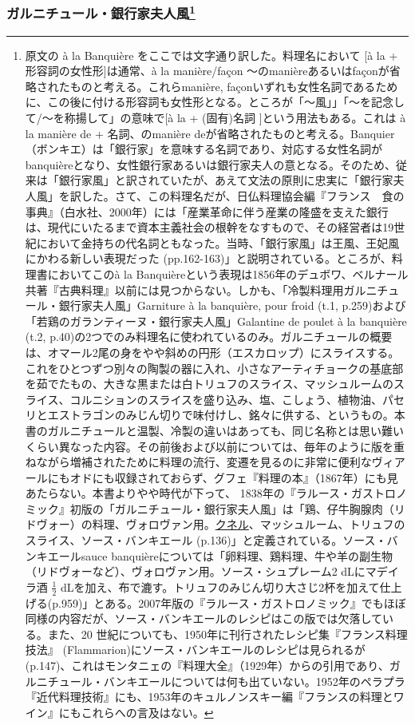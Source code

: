 \begin{recette}
{\subsubsection[ガルニチュール・銀行家夫人風]{\texorpdfstring{ガルニチュール・銀行家夫人風\footnote{原文の
  à la Banquière をここでは文字通り訳した。料理名において {[}à la +
  形容詞の女性形{]}は通常、à la manière/façon
  〜のmanièreあるいはfaçonが省略されたものと考える。これらmanière,
  façonいずれも女性名詞であるために、この後に付ける形容詞も女性形となる。ところが「〜風」」「〜を記念して/〜を称揚して」の意味で{[}à
  la + (固有)名詞 {]}という用法もある。これは à la manière de +
  名詞、のmanière
  deが省略されたものと考える。Banquier（ボンキエ）は「銀行家」を意味する名詞であり、対応する女性名詞がbanquièreとなり、女性銀行家あるいは銀行家夫人の意となる。そのため、従来は「銀行家風」と訳されていたが、あえて文法の原則に忠実に「銀行家夫人風」を訳した。さて、この料理名だが、日仏料理協会編『フランス　食の事典』（白水社、2000年）には「産業革命に伴う産業の隆盛を支えた銀行は、現代にいたるまで資本主義社会の根幹をなすもので、その経営者は19世紀において金持ちの代名詞ともなった。当時、「銀行家風」は王風、王妃風にかわる新しい表現だった
  (pp.162-163)」と説明されている。ところが、料理書においてこのà la
  Banquièreという表現は1856年のデュボワ、ベルナール共著『古典料理』以前には見つからない。しかも、「冷製料理用ガルニチュール・銀行家夫人風」Garniture
  à la banquière, pour froid (t.1,
  p.259)および「若鶏のガランティーヌ・銀行家夫人風」Galantine de poulet
  à la banquière (t.2,
  p.40)の2つでのみ料理名に使われているのみ。ガルニチュールの概要は、オマール2尾の身をやや斜めの円形（エスカロップ）にスライスする。これをひとつずつ別々の陶製の器に入れ、小さなアーティチョークの基底部を茹でたもの、大きな黒または白トリュフのスライス、マッシュルームのスライス、コルニションのスライスを盛り込み、塩、こしょう、植物油、パセリとエストラゴンのみじん切りで味付けし、銘々に供する、というもの。本書のガルニチュールと温製、冷製の違いはあっても、同じ名称とは思い難いくらい異なった内容。その前後および以前については、毎年のように版を重ねながら増補されたために料理の流行、変遷を見るのに非常に便利なヴィアールにもオドにも収録されておらず、グフェ『料理の本』（1867年）にも見あたらない。本書よりやや時代が下って、
  1838年の『ラルース・ガストロノミック』初版の「ガルニチュール・銀行家夫人風」は「鶏、仔牛胸腺肉（リドヴォー）の料理、ヴォロヴァン用。\protect\hyperlink{quenelles}{クネル}、マッシュルーム、トリュフのスライス、ソース・バンキエール
  (p.136)」と定義されている。ソース・バンキエールsauce
  banquièreについては「卵料理、鶏料理、牛や羊の副生物（リドヴォーなど）、ヴォロヴァン用。ソース・シュプレーム2
  dLにマデイラ酒 \(\frac{1}{2}\)
  dLを加え、布で漉す。トリュフのみじん切り大さじ2杯を加えて仕上げる(p.959)」とある。2007年版の『ラルース・ガストロノミック』でもほぼ同様の内容だが、ソース・バンキエールのレシピはこの版では欠落している。また、20
  世紀についても、1950年に刊行されたレシピ集『フランス料理技法』
  (Flammarion)にソース・バンキエールのレシピは見られるが(p.147)、これはモンタニェの『料理大全』（1929年）からの引用であり、ガルニチュール・バンキエールについては何も出ていない。1952年のペラプラ『近代料理技術』にも、1953年のキュルノンスキー編『フランスの料理とワイン』にもこれらへの言及はない。}}{ガルニチュール・銀行家夫人風}}\label{garniture-banquiere}}


\end{recette}
